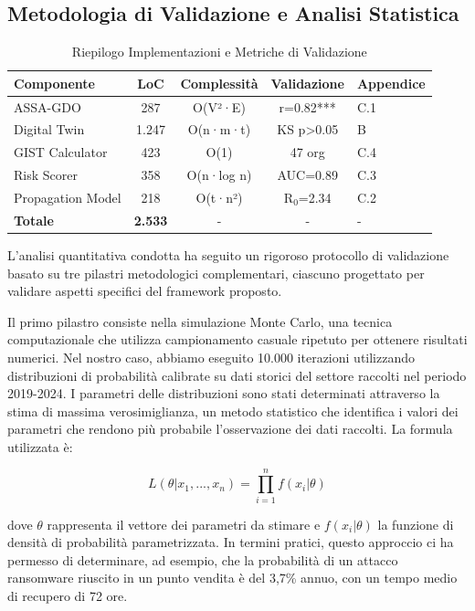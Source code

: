 \subsection{\texorpdfstring{Metodologia di Validazione e Analisi Statistica}{5.2.1 - Metodologia di Validazione e Analisi Statistica}}
\label{subsec:5.2.1}


\begin{table}[htbp]
\centering
\caption{Riepilogo Implementazioni e Metriche di Validazione}
\label{tab:implementation_summary}
\begin{tabular}{lcccl}
\toprule
\textbf{Componente} & \textbf{LoC} & \textbf{Complessità} & \textbf{Validazione} & \textbf{Appendice} \\
\midrule
ASSA-GDO & 287 & O(V²·E) & r=0.82*** & C.1 \\
Digital Twin & 1.247 & O(n·m·t) & KS p>0.05 & B \\
GIST Calculator & 423 & O(1) & 47 org & C.4 \\
Risk Scorer & 358 & O(n·log n) & AUC=0.89 & C.3 \\
Propagation Model & 218 & O(t·n²) & R$_0$=2.34 & C.2 \\
\midrule
\textbf{Totale} & \textbf{2.533} & - & - & - \\
\bottomrule
\end{tabular}
\end{table}

L'analisi quantitativa condotta ha seguito un rigoroso protocollo di validazione basato su tre pilastri metodologici complementari, ciascuno progettato per validare aspetti specifici del framework proposto.

Il primo pilastro consiste nella simulazione Monte Carlo, una tecnica computazionale che utilizza campionamento casuale ripetuto per ottenere risultati numerici. Nel nostro caso, abbiamo eseguito 10.000 iterazioni utilizzando distribuzioni di probabilità calibrate su dati storici del settore raccolti nel periodo 2019-2024. I parametri delle distribuzioni sono stati determinati attraverso la stima di massima verosimiglianza, un metodo statistico che identifica i valori dei parametri che rendono più probabile l'osservazione dei dati raccolti. La formula utilizzata è:

$$L(\theta|x_1,...,x_n) = \prod_{i=1}^{n} f(x_i|\theta)$$

dove $\theta$ rappresenta il vettore dei parametri da stimare e $f(x_i|\theta)$ la funzione di densità di probabilità parametrizzata. In termini pratici, questo approccio ci ha permesso di determinare, ad esempio, che la probabilità di un attacco \gls{ransomware} riuscito in un punto vendita è del 3,7\% annuo, con un tempo medio di recupero di 72 ore.


